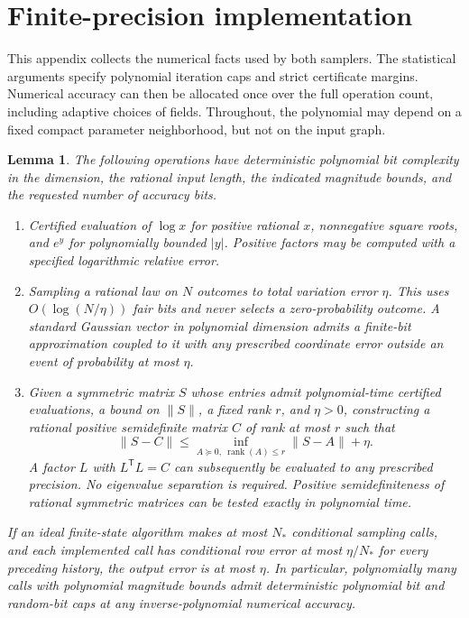 \documentclass[11pt]{article}
\newtheorem{lemma}[thm]{Lemma}
\numberwithin{equation}{section}
\begin{document}
\appendix

\section{Finite-precision implementation}\label{sec:implementation}

This appendix collects the numerical facts used by both samplers. The statistical arguments specify polynomial iteration caps and strict certificate margins. Numerical accuracy can then be allocated once over the full operation count, including adaptive choices of fields. Throughout, the polynomial may depend on a fixed compact parameter neighborhood, but not on the input graph.

\begin{lemma}\label{lem:implementation}
The following operations have deterministic polynomial bit complexity in the dimension, the rational input length, the indicated magnitude bounds, and the requested number of accuracy bits.
\begin{enumerate}[label=\textup{(\roman*)},leftmargin=*]
\item Certified evaluation of $\log x$ for positive rational $x$, nonnegative square roots, and $e^y$ for polynomially bounded $|y|$. Positive factors may be computed with a specified logarithmic relative error.
\item Sampling a rational law on $N$ outcomes to total variation error $\eta$. This uses $O(\log(N/\eta))$ fair bits and never selects a zero-probability outcome. A standard Gaussian vector in polynomial dimension admits a finite-bit approximation coupled to it with any prescribed coordinate error outside an event of probability at most $\eta$.
\item Given a symmetric matrix $S$ whose entries admit polynomial-time certified evaluations, a bound on $\|S\|$, a fixed rank $r$, and $\eta>0$, constructing a rational positive semidefinite matrix $C$ of rank at most $r$ such that
\[
 \|S-C\|\le\inf_{A\succeq0,\ \operatorname{rank}(A)\le r}\|S-A\|+\eta.
\]
A factor $L$ with $L^{\mathsf T}L=C$ can subsequently be evaluated to any prescribed precision. No eigenvalue separation is required. Positive semidefiniteness of rational symmetric matrices can be tested exactly in polynomial time.
\end{enumerate}
If an ideal finite-state algorithm makes at most $N_*$ conditional sampling calls, and each implemented call has conditional row error at most $\eta/N_*$ for every preceding history, the output error is at most $\eta$. In particular, polynomially many calls with polynomial magnitude bounds admit deterministic polynomial bit and random-bit caps at any inverse-polynomial numerical accuracy.
\end{lemma}
\end{document}
